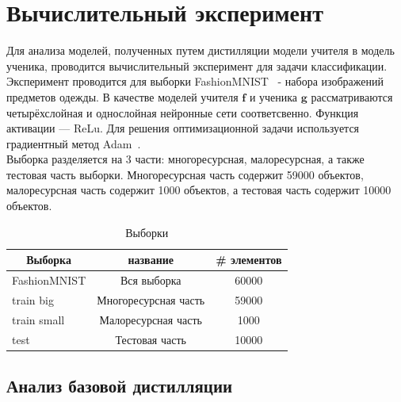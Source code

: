\newpage

\section{Вычислительный эксперимент}

Для анализа моделей, полученных путем дистилляции модели учителя в модель ученика, проводится вычислительный эксперимент для задачи классификации.\\
Эксперимент проводится для выборки FashionMNIST~\cite{FMNIST} - набора изображений предметов одежды. В качестве моделей учителя $\textbf{f}$ и ученика $\textbf{g}$ рассматриваются четырёхслойная и однослойная нейронные сети соответсвенно. Функция активации --- ReLu. Для решения оптимизационной задачи используется градиентный метод Adam~\cite{Adam}.\\
Выборка разделяется на 3 части: многоресурсная, малоресурсная, а также тестовая часть выборки. Многоресурсная часть содержит 59000 объектов, малоресурсная часть содержит 1000 объектов, а тестовая часть содержит 10000 объектов.

\begin{table}[h!t]
\begin{center}
\caption{Выборки}
\label{table_1}
\begin{tabular}{|c|c|c|}
\hline
	Выборка & название &\# элементов\\
	\hline
	\multicolumn{1}{|l|}{FashionMNIST}
	& Вся выборка& 60000\\
	\hline
	\multicolumn{1}{|l|}{train big}
	& Многоресурсная часть& 59000\\
	\hline
	\multicolumn{1}{|l|}{train small}
	& Малоресурсная часть& 1000\\
	\hline
	\multicolumn{1}{|l|}{test}
	& Тестовая часть& 10000\\
\hline

\end{tabular}
\end{center}
\end{table}

\subsection{Анализ базовой дистилляции}

